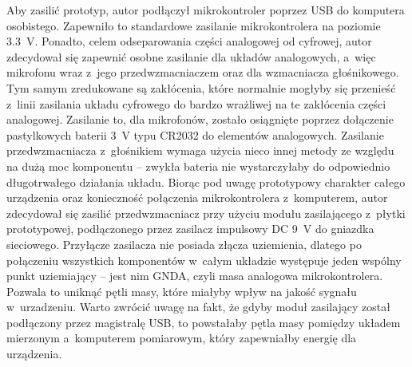 Aby zasilić prototyp, autor podłączył mikrokontroler poprzez USB do komputera osobistego. Zapewniło to standardowe zasilanie mikrokontrolera na poziomie \SI{3.3}{\V}. Ponadto, celem odseparowania części analogowej od cyfrowej, autor zdecydował się zapewnić osobne zasilanie dla układów analogowych, a~więc mikrofonu wraz z~jego przedwzmacniaczem oraz dla wzmacniacza głośnikowego. Tym samym zredukowane są zakłócenia, które normalnie mogłyby się przenieść z~linii zasilania układu cyfrowego do bardzo wrażliwej na te zakłócenia części analogowej. Zasilanie to, dla mikrofonów, zostało osiągnięte poprzez dołączenie pastylkowych baterii \SI{3}{\V} typu CR2032 do elementów analogowych. Zasilanie przedwzmacniacza z~głośnikiem wymaga użycia nieco innej metody ze względu na dużą moc komponentu -- zwykła bateria nie wystarczyłaby do odpowiednio długotrwałego działania układu. Biorąc pod uwagę prototypowy charakter całego urządzenia oraz konieczność połączenia mikrokontrolera z~komputerem, autor zdecydował się zasilić przedwzmacniacz przy użyciu modułu zasilającego z~płytki prototypowej, podłączonego przez zasilacz impulsowy DC \SI{9}{\V} do gniazdka sieciowego. Przyłącze zasilacza nie posiada złącza uziemienia, dlatego po połączeniu wszystkich komponentów w~całym układzie występuje jeden wspólny punkt uziemiający -- jest nim GNDA, czyli masa analogowa mikrokontrolera. Pozwala to uniknąć pętli masy, które miałyby wpływ na jakość sygnału w~urzadzeniu. Warto zwrócić uwagę na fakt, że gdyby moduł zasilający został podłączony przez magistralę USB, to powstałaby pętla masy pomiędzy układem mierzonym a~komputerem pomiarowym, który zapewniałby energię dla urządzenia.